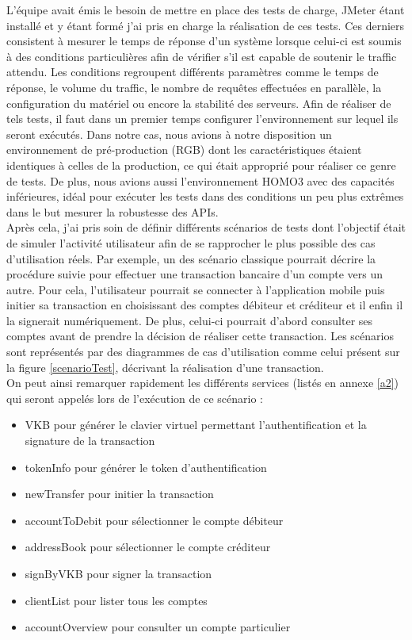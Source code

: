 	L'équipe avait émis le besoin de mettre en place des tests de charge, JMeter étant installé et y étant formé j'ai pris en charge la réalisation de ces tests. Ces derniers consistent à mesurer le temps de réponse d'un système lorsque celui-ci est soumis à des conditions particulières afin de vérifier s'il est capable de soutenir le traffic attendu. Les conditions regroupent différents paramètres comme le temps de réponse, le volume du traffic, le nombre de requêtes effectuées en parallèle, la configuration du matériel ou encore la stabilité des serveurs. Afin de réaliser de tels tests, il faut dans un premier temps configurer l'environnement sur lequel ils seront exécutés. Dans notre cas, nous avions à notre disposition un environnement de pré-production (RGB) dont les caractéristiques étaient identiques à celles de la production, ce qui était approprié pour réaliser ce genre de tests. De plus, nous avions aussi l'environnement HOMO3 avec des capacités inférieures, idéal pour exécuter les tests dans des conditions un peu plus extrêmes dans le but mesurer la robustesse des APIs. \\
	
	Après cela, j'ai pris soin de définir différents scénarios de tests dont l'objectif était de simuler l'activité utilisateur afin de se rapprocher le plus possible des cas d'utilisation réels. Par exemple, un des scénario classique pourrait décrire la procédure suivie pour effectuer une transaction bancaire d'un compte vers un autre. Pour cela, l'utilisateur pourrait se connecter à l'application mobile puis initier sa transaction en choisissant des comptes débiteur et créditeur et il enfin il la signerait numériquement. De plus, celui-ci pourrait d'abord consulter ses comptes avant de prendre la décision de réaliser cette transaction. Les scénarios sont représentés par des diagrammes de cas d'utilisation comme celui présent sur la figure \ref{scenarioTest}, décrivant la réalisation d'une transaction. \\

	On peut ainsi remarquer rapidement les différents services (listés en annexe \ref{a2}) qui seront appelés lors de l'exécution de ce scénario :
	\begin{itemize}
		\item VKB pour générer le clavier virtuel permettant l'authentification et la signature de la transaction
		\item tokenInfo pour générer le token d'authentification
		\item newTransfer pour initier la transaction
		\item accountToDebit pour sélectionner le compte débiteur
		\item addressBook pour sélectionner le compte créditeur
		\item signByVKB pour signer la transaction
		\item clientList pour lister tous les comptes
		\item accountOverview pour consulter un compte particulier \\
	\end{itemize}
	
